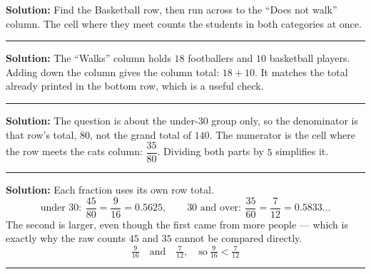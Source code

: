 \documentclass[12pt]{article}
\begin{document}



\textbf{Solution:} \quad Find the Basketball row, then run across to the ``Does not walk'' column.
The cell where they meet counts the students in both categories at once. 

\vspace{0.2cm}

\noindent\rule{\linewidth}{0.2pt}


\textbf{Solution:} \quad The ``Walks'' column holds $18$ footballers and $10$ basketball players.
Adding down the column gives the column total: $18 + 10$. It matches the total already printed in
the bottom row, which is a useful check. 

\vspace{0.2cm}

\noindent\rule{\linewidth}{0.2pt}


\textbf{Solution:} \quad The question is about the under-30 group only, so the denominator is that
row's total, $80$, not the grand total of $140$. The numerator is the cell where the row meets the
cats column: $\dfrac{35}{80}$. Dividing both parts by $5$ simplifies it. 

\vspace{0.2cm}

\noindent\rule{\linewidth}{0.2pt}


\textbf{Solution:} \quad Each fraction uses its own row total.
\[ \text{under 30}: \ \frac{45}{80} = \frac{9}{16} = 0.5625, \qquad
   \text{30 and over}: \ \frac{35}{60} = \frac{7}{12} = 0.5833\ldots \]
The second is larger, even though the first came from more people --- which is exactly why the
raw counts $45$ and $35$ cannot be compared directly.
\[ \boxed{\tfrac{9}{16} \quad \text{and} \quad \tfrac{7}{12}, \quad \text{so} \ \tfrac{9}{16} < \tfrac{7}{12}} \]

\vspace{0.2cm}

\noindent\rule{\linewidth}{0.2pt}
\end{document}
